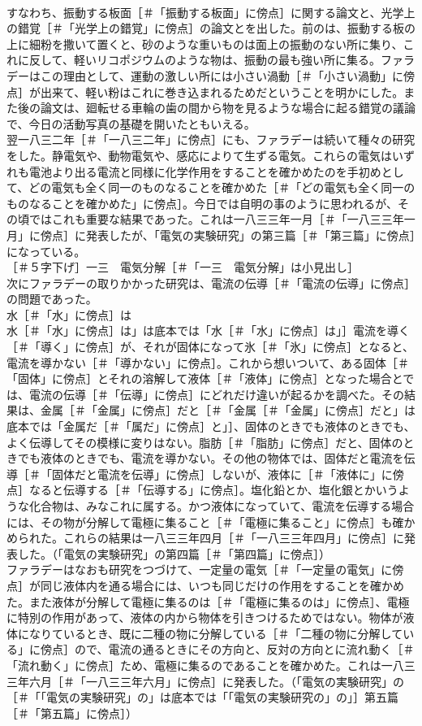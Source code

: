 \documentclass[8pt]{extreport}
\begin{document}
\begin{CJK}{UTF8}{min}
\\	すなわち、振動する板面［＃「振動する板面」に傍点］に関する論文と、光学上の錯覚［＃「光学上の錯覚」に傍点］の論文とを出した。前のは、振動する板の上に細粉を撒いて置くと、砂のような重いものは面上の振動のない所に集り、これに反して、軽いリコポジウムのような物は、振動の最も強い所に集る。ファラデーはこの理由として、運動の激しい所には小さい渦動［＃「小さい渦動」に傍点］が出来て、軽い粉はこれに巻き込まれるためだということを明かにした。また後の論文は、廻転せる車輪の歯の間から物を見るような場合に起る錯覚の議論で、今日の活動写真の基礎を開いたともいえる。
\\	翌一八三二年［＃「一八三二年」に傍点］にも、ファラデーは続いて種々の研究をした。静電気や、動物電気や、感応によりて生ずる電気。これらの電気はいずれも電池より出る電流と同様に化学作用をすることを確かめたのを手初めとして、どの電気も全く同一のものなることを確かめた［＃「どの電気も全く同一のものなることを確かめた」に傍点］。今日では自明の事のように思われるが、その頃ではこれも重要な結果であった。これは一八三三年一月［＃「一八三三年一月」に傍点］に発表したが、「電気の実験研究」の第三篇［＃「第三篇」に傍点］になっている。
\\	［＃５字下げ］一三　電気分解［＃「一三　電気分解」は小見出し］
\\	次にファラデーの取りかかった研究は、電流の伝導［＃「電流の伝導」に傍点］の問題であった。
\\	水［＃「水」に傍点］は
\\	水［＃「水」に傍点］は」は底本では「水［＃「水」に傍点］は」］電流を導く［＃「導く」に傍点］が、それが固体になって氷［＃「氷」に傍点］となると、電流を導かない［＃「導かない」に傍点］。これから想いついて、ある固体［＃「固体」に傍点］とそれの溶解して液体［＃「液体」に傍点］となった場合とでは、電流の伝導［＃「伝導」に傍点］にどれだけ違いが起るかを調べた。その結果は、金属［＃「金属」に傍点］だと［＃「金属［＃「金属」に傍点］だと」は底本では「金属だ［＃「属だ」に傍点］と」］、固体のときでも液体のときでも、よく伝導してその模様に変りはない。脂肪［＃「脂肪」に傍点］だと、固体のときでも液体のときでも、電流を導かない。その他の物体では、固体だと電流を伝導［＃「固体だと電流を伝導」に傍点］しないが、液体に［＃「液体に」に傍点］なると伝導する［＃「伝導する」に傍点］。塩化鉛とか、塩化銀とかいうような化合物は、みなこれに属する。かつ液体になっていて、電流を伝導する場合には、その物が分解して電極に集ること［＃「電極に集ること」に傍点］も確かめられた。これらの結果は一八三三年四月［＃「一八三三年四月」に傍点］に発表した。（「電気の実験研究」の第四篇［＃「第四篇」に傍点］）
\\	ファラデーはなおも研究をつづけて、一定量の電気［＃「一定量の電気」に傍点］が同じ液体内を通る場合には、いつも同じだけの作用をすることを確かめた。また液体が分解して電極に集るのは［＃「電極に集るのは」に傍点］、電極に特別の作用があって、液体の内から物体を引きつけるためではない。物体が液体になりているとき、既に二種の物に分解している［＃「二種の物に分解している」に傍点］ので、電流の通るときにその方向と、反対の方向とに流れ動く［＃「流れ動く」に傍点］ため、電極に集るのであることを確かめた。これは一八三三年六月［＃「一八三三年六月」に傍点］に発表した。（「電気の実験研究」の［＃「「電気の実験研究」の」は底本では「「電気の実験研究の」の」］第五篇［＃「第五篇」に傍点］）

\end{CJK}
\end{document}
